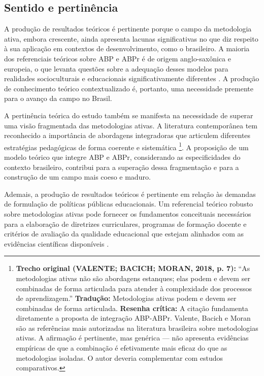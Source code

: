 \subsection{Sentido e pertinência}
\label{subsec:jt_sentido}

A produção de resultados teóricos é pertinente porque o campo da metodologia ativa, embora crescente, ainda apresenta lacunas significativas no que diz respeito à sua aplicação em contextos de desenvolvimento, como o brasileiro. A maioria dos referenciais teóricos sobre ABP e ABPr é de origem anglo-saxônica e europeia, o que levanta questões sobre a adequação desses modelos para realidades socioculturais e educacionais significativamente diferentes \cite{BONWELL1991}. A produção de conhecimento teórico contextualizado é, portanto, uma necessidade premente para o avanço da campo no Brasil.

A pertinência teórica do estudo também se manifesta na necessidade de superar uma visão fragmentada das metodologias ativas. A literatura contemporânea tem reconhecido a importância de abordagens integradoras que articulem diferentes estratégias pedagógicas de forma coerente e sistemática \cite{VALENTE2018}\footnote{\textbf{Trecho original (VALENTE; BACICH; MORAN, 2018, p. 7):} ``As metodologias ativas não são abordagens estanques; elas podem e devem ser combinadas de forma articulada para atender à complexidade dos processos de aprendizagem.'' \textbf{Tradução:} Metodologias ativas podem e devem ser combinadas de forma articulada. \textbf{Resenha crítica:} A citação fundamenta diretamente a proposta de integração ABP-ABPr. Valente, Bacich e Moran são as referências mais autorizadas na literatura brasileira sobre metodologias ativas. A afirmação é pertinente, mas genérica — não apresenta evidências empíricas de que a combinação é efetivamente mais eficaz do que as metodologias isoladas. O autor deveria complementar com estudos comparativos.}. A proposição de um modelo teórico que integre ABP e ABPr, considerando as especificidades do contexto brasileiro, contribui para a superação dessa fragmentação e para a construção de um campo mais coeso e maduro.

Ademais, a produção de resultados teóricos é pertinente em relação às demandas de formulação de políticas públicas educacionais. Um referencial teórico robusto sobre metodologias ativas pode fornecer os fundamentos conceituais necessários para a elaboração de diretrizes curriculares, programas de formação docente e critérios de avaliação da qualidade educacional que estejam alinhados com as evidências científicas disponíveis \cite{BRASIL2018}.


